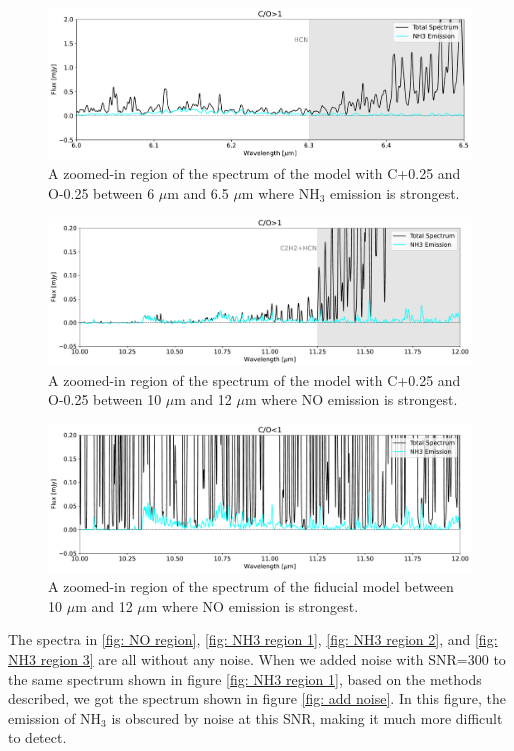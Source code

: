 \documentclass[twoside, single, authoryear, semicolon, 12pt]{lion-msc}
\newcommand{\4}{$_4$}
\newcommand{\3}{$_3$}
\newcommand{\2}{$_2$}
\begin{document}
\begin{figure}[!ht]
    \centering
    \includegraphics[width=\linewidth]{Figures/NH3_region1.pdf}
    \caption{A zoomed-in region of the spectrum of the model with C+0.25 and O-0.25 between 6 $\mu$m and 6.5 $\mu$m where NH\3 emission is strongest.}
    \label{fig: NH3 region 1}
\end{figure}
\begin{figure}[!ht]
    \centering
    \includegraphics[width=\linewidth]{Figures/NH3_region2.pdf}
    \caption{A zoomed-in region of the spectrum of the model with C+0.25 and O-0.25 between 10 $\mu$m and 12 $\mu$m where NO emission is strongest.}
    \label{fig: NH3 region 2}
\end{figure}
\begin{figure}[!ht]
    \centering
    \includegraphics[width=\linewidth]{Figures/NH3_region3.pdf}
    \caption{A zoomed-in region of the spectrum of the fiducial model between 10 $\mu$m and 12 $\mu$m where NO emission is strongest.}
    \label{fig: NH3 region 3}
\end{figure}

The spectra in \autoref{fig: NO region}, \autoref{fig: NH3 region 1}, \autoref{fig: NH3 region 2}, and \autoref{fig: NH3 region 3} are all without any noise. When we added noise with SNR=300 to the same spectrum shown in figure \autoref{fig: NH3 region 1}, based on the methods described, we got the spectrum shown in figure \autoref{fig: add noise}. In this figure, the emission of NH\3 is obscured by noise at this SNR, making it much more difficult to detect.  
\end{document}
